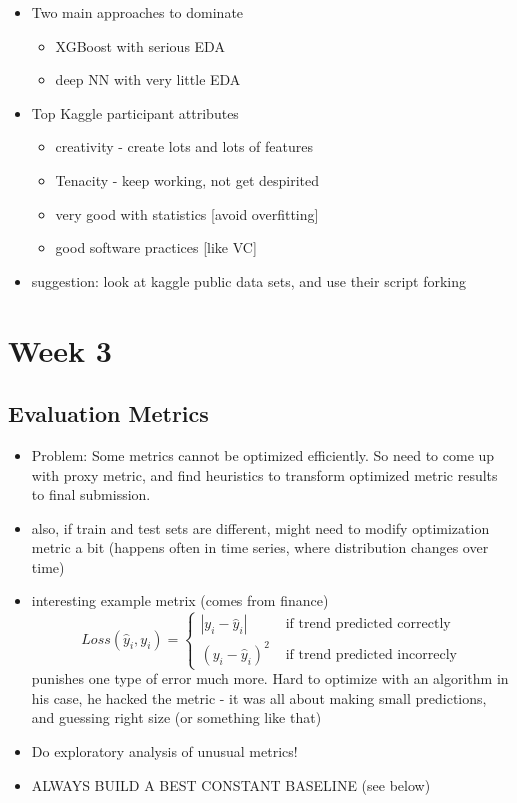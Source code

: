 \documentclass[a4paper]{report}
\begin{document}
\begin{itemize}
\begin{itemize}
      \item Two main approaches to dominate
	\begin{itemize}
	  \item XGBoost with serious EDA
	  \item deep NN with very little EDA
	\end{itemize}
      \item Top Kaggle participant attributes
	\begin{itemize}
	  \item creativity - create lots and lots of features
	  \item Tenacity - keep working, not get despirited
	  \item very good with statistics [avoid overfitting]
	  \item good software practices [like VC]
	\end{itemize}
      \item suggestion: look at kaggle public data sets, and use their script forking
    \end{itemize}
\end{itemize}


\chapter{Week 3}
\section{Evaluation Metrics}
\begin{itemize}
  \item  Problem: Some metrics cannot be optimized efficiently. So need to come up with proxy metric, and find heuristics to transform optimized metric results to final submission.
  \item also, if train and test sets are different, might need to modify optimization metric a bit (happens often in time series, where distribution changes over time)
  \item interesting example metrix (comes from finance)
    \begin{equation}
      Loss(\hat{y}_i, y_i) = 
      \begin{cases}
	|y_i - \hat{y}_i| & \mbox{ if trend predicted correctly} \\
	(y_i - \hat{y}_i)^2 & \mbox{ if trend predicted incorrecly}
      \end{cases}
    \end{equation}
    \subitem punishes one type of error much more.
    \subitem Hard to optimize with an algorithm
    \subitem in his case, he hacked the metric - it was all about making small predictions, and guessing right size (or something like that)
  \item Do exploratory analysis of unusual metrics!
  \item ALWAYS BUILD A BEST CONSTANT BASELINE (see below)
\end{itemize}
\end{document}
